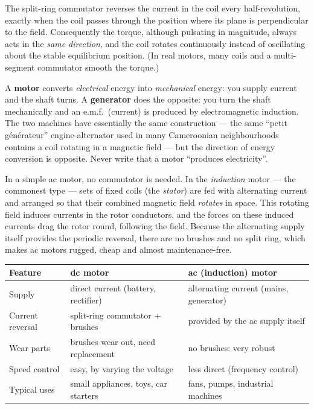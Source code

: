 \documentclass[11pt]{article}
\newcounter{popsec}
\newcounter{popsub}
\newcommand{\courssub}[1]{%
  \stepcounter{popsub}%
  \par\vspace{9pt}\noindent{\popxbold\fontsize{11.5}{13}\selectfont\color{popink}{\color{poporange}\thepopsec.\thepopsub}\hspace{6pt}#1}\par\nopagebreak\vspace{4pt}
}
\begin{document}
\begin{propriete}
The split-ring commutator reverses the current in the coil every half-revolution, exactly when the coil passes through the position where its plane is perpendicular to the field. Consequently the torque, although pulsating in magnitude, always acts in the \emph{same direction}, and the coil rotates continuously instead of oscillating about the stable equilibrium position. (In real motors, many coils and a multi-segment commutator smooth the torque.)
\end{propriete}

\begin{attention}
A \textbf{motor} converts \emph{electrical} energy into \emph{mechanical} energy: you supply current and the shaft turns. A \textbf{generator} does the opposite: you turn the shaft mechanically and an e.m.f.\ (current) is produced by electromagnetic induction. The two machines have essentially the same construction --- the same ``petit g\'en\'erateur'' engine-alternator used in many Cameroonian neighbourhoods contains a coil rotating in a magnetic field --- but the direction of energy conversion is opposite. Never write that a motor ``produces electricity''.
\end{attention}

\courssub{The Alternating-Current (ac) Motor}

In a simple ac motor, no commutator is needed. In the \emph{induction} motor --- the commonest type --- sets of fixed coils (the \emph{stator}) are fed with alternating current and arranged so that their combined magnetic field \emph{rotates} in space. This rotating field induces currents in the rotor conductors, and the forces on these induced currents drag the rotor round, following the field. Because the alternating supply itself provides the periodic reversal, there are no brushes and no split ring, which makes ac motors rugged, cheap and almost maintenance-free.

\begin{center}
\begin{tabularx}{\linewidth}{|l|X|X|}
\hline
\rowcolor{popblueL} Feature & dc motor & ac (induction) motor \\
\hline
Supply & direct current (battery, rectifier) & alternating current (mains, generator) \\
\hline
Current reversal & split-ring commutator + brushes & provided by the ac supply itself \\
\hline
Wear parts & brushes wear out, need replacement & no brushes: very robust \\
\hline
Speed control & easy, by varying the voltage & less direct (frequency control) \\
\hline
Typical uses & small appliances, toys, car starters & fans, pumps, industrial machines \\
\hline
\end{tabularx}
\end{center}
\end{document}
